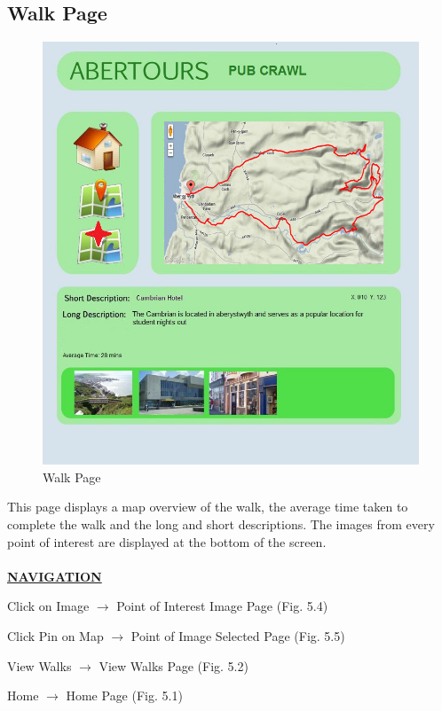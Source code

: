 \documentclass[12pt]{article}
\begin{document}
\subsection{Walk Page}
\begin{figure}[htp]
\centering
\includegraphics[scale=0.50]{Project_Plan/Web/poi_selected_page_01_copy.jpg}

\caption{Walk Page }
\label{Walk Page}
\end{figure}
\par{This page displays a map overview of the walk, the average time taken to complete the walk and the long and short descriptions. The images from every point of interest are displayed at the bottom of the screen. \\ \\}
\textbf{\uline{NAVIGATION}}
\par{Click on Image $\rightarrow$ Point of Interest Image Page (Fig. 5.4)}
\par{Click Pin on Map $\rightarrow$ Point of Image Selected Page (Fig. 5.5)}
\par{View Walks $\rightarrow$ View Walks Page (Fig. 5.2)}
\par{Home $\rightarrow$ Home Page (Fig. 5.1)}
\clearpage
\end{document}
